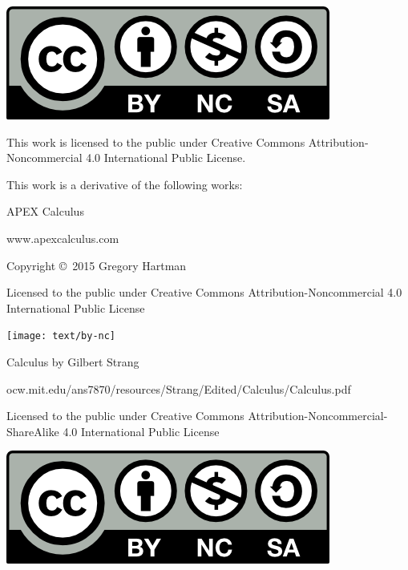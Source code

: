 \noindent
\hskip -1in

\begin{minipage}{2in}
	\includegraphics{text/by-nc-sa} 
\end{minipage}

\bigskip

\begin{minipage}{3in}
	\noindent 
	This work is licensed to the public under Creative Commons Attribution-Noncommercial 4.0 International Public License.
	
	\bigskip
	
	\noindent
	This work is a derivative of the following works:
	
\end{minipage}

\bigskip

\begin{minipage}{3in}
	\noindent
	APEX Calculus

	\noindent
	www.apexcalculus.com
	
	\noindent 
	Copyright \copyright\ 2015 Gregory Hartman

	Licensed to the public under Creative Commons Attribution-Noncommercial 4.0 International Public License
\end{minipage}

\bigskip

\begin{minipage}{2in}
	\texttt{[image: text/by-nc]} 
\end{minipage}

\bigskip

\begin{minipage}{3in}
	\noindent 
	Calculus by Gilbert Strang

    \noindent    
    ocw.mit.edu/ans7870/resources/Strang/Edited/Calculus/Calculus.pdf
	
    \noindent	
	Licensed to the public under Creative Commons Attribution-Noncommercial-ShareAlike 4.0 International Public License
\end{minipage}

\bigskip

\begin{minipage}{2in}
	\includegraphics{text/by-nc-sa} 
\end{minipage}


